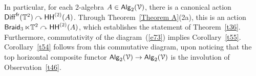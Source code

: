 \documentclass{amsart}
\newtheorem{prop}[theorem]{Proposition}
\theoremstyle{definition}
\theoremstyle{remark}
\DeclareMathOperator{\Alg}{\sf Alg}
\newcommand{\bit}[1]{\textbf{\textit{#1}}}
\newcommand{\lacts}{\curvearrowright}
\DeclareMathOperator{\Diff}{{\sf Diff}}
\DeclareMathOperator{\fr}{\sf fr}
\def\cE{\mathcal E}\def\cF{\mathcal F}\def\cG{\mathcal G}\def\cH{\mathcal H}
\DeclareMathOperator{\Braid}{{\sf Braid}_3}
\DeclareMathOperator{\sHH}{\sf HH}
\DeclareMathOperator{\HHt}{{\sf HH}^{(2)}}
\begin{document}
In particular, for each 2-algebra $A\in \Alg_2(\cV)$, there is a canonical action $\Diff^{\fr}(\TT^2) \lacts \HHt(A)$.
Through Theorem~\ref{Theorem A}(2a), this is an action $\Braid \ltimes \TT^2 \lacts \HHt(A)$, which establishes the statement of Theorem~\ref{t36}.
Furthermore, commutativity of the diagram~(\ref{e73}) implies Corollary~\ref{t55}.  
Corollary~\ref{t54} follows from this commutative diagram, upon noticing that the top horizontal composite functor $\Alg_2(\cV) \to \Alg_2(\cV)$ is the involution of Observation~\ref{t46}.









%
%
%
%
%
%
%
%
%
%
%
%
%
%
%
%
\end{document}
